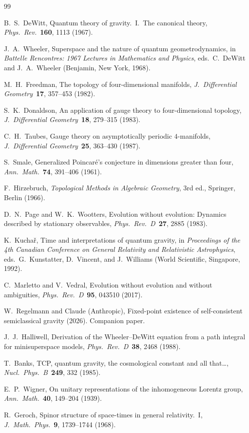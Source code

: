 \documentclass[12pt,a4paper]{article}
\theoremstyle{definition}
\theoremstyle{remark}
\begin{document}
\begin{thebibliography}{99}

 B.~S.~DeWitt, Quantum theory of gravity.~I.~The canonical
theory, \textit{Phys.\ Rev.}\ \textbf{160}, 1113 (1967).

 J.~A.~Wheeler, Superspace and the nature of quantum
geometrodynamics, in \textit{Battelle Rencontres: 1967 Lectures in
Mathematics and Physics}, eds.\ C.~DeWitt and J.~A.~Wheeler (Benjamin,
New York, 1968).

 M.~H.~Freedman, The topology of four-dimensional manifolds,
\textit{J.\ Differential Geometry}\ \textbf{17}, 357--453 (1982).

 S.~K.~Donaldson, An application of gauge theory to
four-dimensional topology, \textit{J.\ Differential Geometry}\ \textbf{18},
279--315 (1983).

 C.~H.~Taubes, Gauge theory on asymptotically periodic
$4$-manifolds, \textit{J.\ Differential Geometry}\ \textbf{25}, 363--430 (1987).

 S.~Smale, Generalized Poincar\'e's conjecture in dimensions
greater than four, \textit{Ann.\ Math.}\ \textbf{74}, 391--406 (1961).

 F.~Hirzebruch, \textit{Topological Methods in Algebraic
Geometry}, 3rd ed., Springer, Berlin (1966).

 D.~N.~Page and W.~K.~Wootters, Evolution without
evolution: Dynamics described by stationary observables,
\textit{Phys.\ Rev.\ D}\ \textbf{27}, 2885 (1983).

 K.~Kucha\v{r}, Time and interpretations of quantum
gravity, in \textit{Proceedings of the 4th Canadian Conference on General
Relativity and Relativistic Astrophysics}, eds.\ G.~Kunstatter,
D.~Vincent, and J.~Williams (World Scientific, Singapore, 1992).

 C.~Marletto and V.~Vedral, Evolution without
evolution and without ambiguities, \textit{Phys.\ Rev.\ D}\ \textbf{95},
043510 (2017).

 W.~Regelmann and Claude (Anthropic), Fixed-point
existence of self-consistent semiclassical gravity (2026). Companion paper.

 J.~J.~Halliwell, Derivation of the Wheeler--DeWitt
equation from a path integral for minisuperspace models,
\textit{Phys.\ Rev.\ D}\ \textbf{38}, 2468 (1988).

 T.~Banks, TCP, quantum gravity, the cosmological constant
and all that\ldots, \textit{Nucl.\ Phys.\ B}\ \textbf{249}, 332 (1985).

 E.~P.~Wigner, On unitary representations of the
inhomogeneous Lorentz group, \textit{Ann.\ Math.}\ \textbf{40}, 149--204
(1939).

 R.~Geroch, Spinor structure of space-times in general
relativity.~I, \textit{J.\ Math.\ Phys.}\ \textbf{9}, 1739--1744 (1968).

\end{thebibliography}
\end{document}
